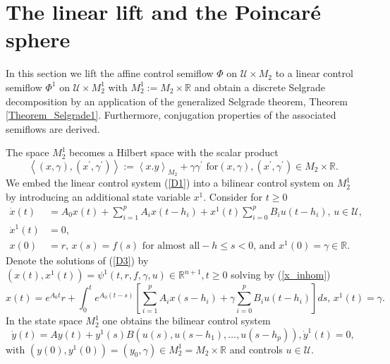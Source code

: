 \documentclass{siamltex}%
\begin{document}
\section{The linear lift and the Poincar\'{e} sphere\label{Section6}}

In this section we lift the affine control semiflow $\Phi$ on $\mathcal{U}%
\times M_{2}$ to a linear control semiflow $\Phi^{1}$ on $\mathcal{U}\times
M_{2}^{1}$ with $M_{2}^{1}:=M_{2}\times\mathbb{R}$ and obtain a discrete
Selgrade decomposition by an application of the generalized Selgrade theorem,
Theorem \ref{Theorem_Selgrade1}. Furthermore, conjugation properties of the
associated semiflows are derived.

The space $M_{2}^{1}$ becomes a Hilbert space with the scalar product%
\[
\left\langle (x,\gamma),(x^{\prime},\gamma^{\prime})\right\rangle
:=\left\langle x.y\right\rangle _{M_{2}}+\gamma\gamma^{\prime}\text{ for
}(x,\gamma),(x^{\prime},\gamma^{\prime})\in M_{2}\times\mathbb{R}.
\]
We embed the linear control system (\ref{D1}) into a bilinear control system
on $M_{2}^{1}$ by introducing an additional state variable $x^{1}$. Consider
for $t\geq0$%
\begin{align}
\dot{x}(t)  &  =A_{0}x(t)+\sum_{i=1}^{p}A_{i}x(t-h_{i})+x^{1}(t)\sum_{i=0}%
^{p}B_{i}u(t-h_{i}),\,u\in\mathcal{U},\nonumber\\
\dot{x}^{1}(t)  &  =0,\label{D3}\\
x(0)  &  =r,\,x(s)=f(s)\text{ for almost all}-h\leq s<0\text{, and }%
x^{1}(0)=\gamma\in\mathbb{R}.\nonumber
\end{align}
Denote the solutions of (\ref{D3}) by $(x(t),x^{1}(t))=\psi^{1}(t,r,f,\gamma
,u)\in\mathbb{R}^{n+1},t\geq0$ solving by (\ref{x_inhom})%
\[
x(t)=e^{A_{0}t}r+\int_{0}^{t}e^{A_{0}(t-s)}\left[  \sum_{i=1}^{p}%
A_{i}x(s-h_{i})+\gamma\sum_{i=0}^{p}B_{i}u(t-h_{i})\right]  ds,\,x^{1}%
(t)=\gamma.
\]
In the state space $M_{2}^{1}$ one obtains the bilinear control system%
\begin{equation}
\dot{y}(t)=Ay(t)+y^{1}(s)B\left(  u(s),u(s-h_{1}),\ldots,u(s-h_{p})\right)
,\dot{y}^{1}(t)=0, \label{linear_lift}%
\end{equation}
with $(y(0),y^{1}(0))=\left(  y_{0},\gamma\right)  \in M_{2}^{1}=M_{2}%
\times\mathbb{R}$ and controls $u\in\mathcal{U}$.
\end{document}
